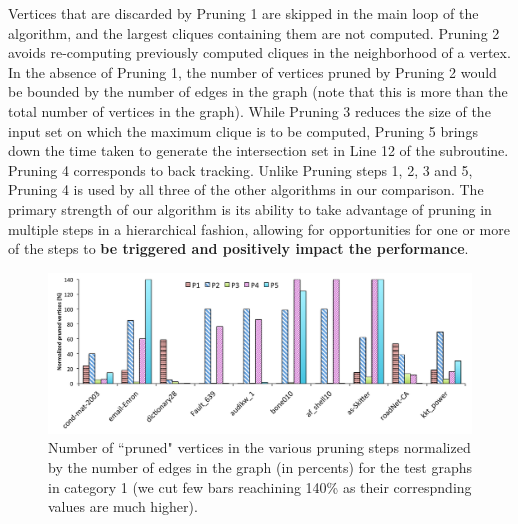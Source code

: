 


Vertices that are discarded by Pruning 1 are skipped in the main loop of the algorithm, and the largest cliques containing them are not computed. Pruning 2 avoids re-computing previously computed cliques in the neighborhood of a vertex. In the absence of Pruning 1, the number of vertices pruned by Pruning 2 would be bounded by the number of edges in the graph (note that this is more than the total number of vertices in the graph). While Pruning 3 reduces the size of the input set on which the maximum clique is to be computed, Pruning 5 brings down the time taken to generate the intersection set in Line 12 of the subroutine. 
Pruning 4 corresponds to back tracking. Unlike Pruning steps 1, 2, 3 and 5, Pruning 4
is used  by all three of the other algorithms in our comparison. The primary strength of our algorithm is its ability to take advantage of pruning in multiple steps in a hierarchical fashion, allowing for opportunities for one or more of the steps to {\bf be triggered and positively impact the performance}.

\begin{figure}
  \centering
    \includegraphics[scale=0.5]{pruned.pdf}
\caption{Number of ``pruned" vertices in the various pruning steps normalized
by the number of edges in the graph (in percents) for the test graphs in category 1 (we cut few bars reachining 140\% as their correspnding values are much higher).}
\label{fig-pruningplot}
\end{figure}


